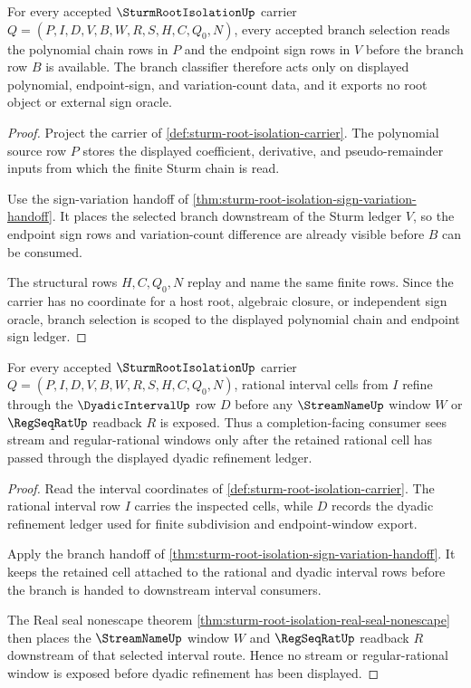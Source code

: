 \begin{theorem}
\label{thm:sturm-root-isolation-sign-variation-scope}
For every accepted $\SturmRootIsolationUp$ carrier $Q=(P,I,D,V,B,W,R,S,H,C,Q_0,N)$, every accepted branch selection reads the polynomial chain rows in $P$ and the endpoint sign rows in $V$ before the branch row $B$ is available. The branch classifier therefore acts only on displayed polynomial, endpoint-sign, and variation-count data, and it exports no root object or external sign oracle.
\end{theorem}
\begin{proof}
Project the carrier of \autoref{def:sturm-root-isolation-carrier}. The polynomial source row $P$ stores the displayed coefficient, derivative, and pseudo-remainder inputs from which the finite Sturm chain is read.

Use the sign-variation handoff of \autoref{thm:sturm-root-isolation-sign-variation-handoff}. It places the selected branch downstream of the Sturm ledger $V$, so the endpoint sign rows and variation-count difference are already visible before $B$ can be consumed.

The structural rows $H,C,Q_0,N$ replay and name the same finite rows. Since the carrier has no coordinate for a host root, algebraic closure, or independent sign oracle, branch selection is scoped to the displayed polynomial chain and endpoint sign ledger.
\end{proof}

\begin{theorem}
\label{thm:sturm-root-isolation-interval-refinement}
For every accepted $\SturmRootIsolationUp$ carrier $Q=(P,I,D,V,B,W,R,S,H,C,Q_0,N)$, rational interval cells from $I$ refine through the $\DyadicIntervalUp$ row $D$ before any $\StreamNameUp$ window $W$ or $\RegSeqRatUp$ readback $R$ is exposed. Thus a completion-facing consumer sees stream and regular-rational windows only after the retained rational cell has passed through the displayed dyadic refinement ledger.
\end{theorem}
\begin{proof}
Read the interval coordinates of \autoref{def:sturm-root-isolation-carrier}. The rational interval row $I$ carries the inspected cells, while $D$ records the dyadic refinement ledger used for finite subdivision and endpoint-window export.

Apply the branch handoff of \autoref{thm:sturm-root-isolation-sign-variation-handoff}. It keeps the retained cell attached to the rational and dyadic interval rows before the branch is handed to downstream interval consumers.

The Real seal nonescape theorem \autoref{thm:sturm-root-isolation-real-seal-nonescape} then places the $\StreamNameUp$ window $W$ and $\RegSeqRatUp$ readback $R$ downstream of that selected interval route. Hence no stream or regular-rational window is exposed before dyadic refinement has been displayed.
\end{proof}

